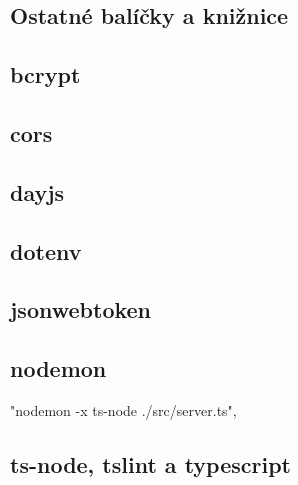 \subsection{Ostatné balíčky a knižnice}
\subsection*{bcrypt}

\subsection*{cors}

\subsection*{dayjs}

\subsection*{dotenv}

\subsection*{jsonwebtoken}

\subsection*{nodemon}
"nodemon -x ts-node ./src/server.ts",

\subsection*{ts-node, tslint a typescript}